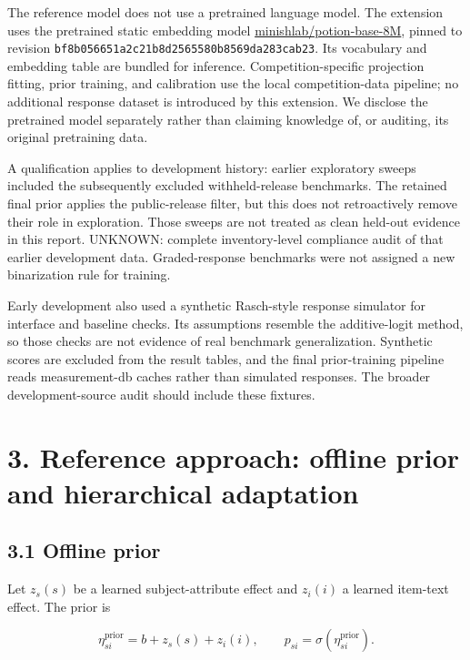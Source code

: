 \documentclass{article}
\providecommand{\passthrough}[1]{#1}
\begin{document}
The reference model does not use a pretrained language model. The extension uses the pretrained static embedding model \href{https://huggingface.co/minishlab/potion-base-8M}{minishlab/potion-base-8M}, pinned to revision \passthrough{\lstinline!bf8b056651a2c21b8d2565580b8569da283cab23!}. Its vocabulary and embedding table are bundled for inference. Competition-specific projection fitting, prior training, and calibration use the local competition-data pipeline; no additional response dataset is introduced by this extension. We disclose the pretrained model separately rather than claiming knowledge of, or auditing, its original pretraining data.

A qualification applies to development history: earlier exploratory sweeps included the subsequently excluded withheld-release benchmarks. The retained final prior applies the public-release filter, but this does not retroactively remove their role in exploration. Those sweeps are not treated as clean held-out evidence in this report. UNKNOWN: complete inventory-level compliance audit of that earlier development data. Graded-response benchmarks were not assigned a new binarization rule for training.

Early development also used a synthetic Rasch-style response simulator for interface and baseline checks. Its assumptions resemble the additive-logit method, so those checks are not evidence of real benchmark generalization. Synthetic scores are excluded from the result tables, and the final prior-training pipeline reads measurement-db caches rather than simulated responses. The broader development-source audit should include these fixtures.

\section{3. Reference approach: offline prior and hierarchical adaptation}\label{reference-approach-offline-prior-and-hierarchical-adaptation}

\subsection{3.1 Offline prior}\label{offline-prior}

Let \(z_s(s)\) be a learned subject-attribute effect and \(z_i(i)\) a learned item-text effect. The prior is

\[\eta_{si}^{\mathrm{prior}}=b+z_s(s)+z_i(i),\qquad p_{si}=\sigma(\eta_{si}^{\mathrm{prior}}).\]
\end{document}
